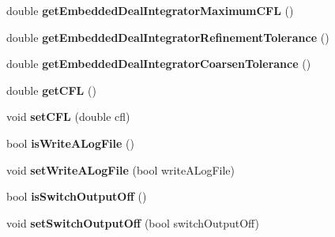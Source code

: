 \begin{DoxyCompactItemize}
\item 
\hypertarget{classnatrium_1_1SolverConfiguration_a0116178f32e79bc60e115135becba20d}{
double {\bfseries getEmbeddedDealIntegratorMaximumCFL} ()}
\label{classnatrium_1_1SolverConfiguration_a0116178f32e79bc60e115135becba20d}

\item 
\hypertarget{classnatrium_1_1SolverConfiguration_a2c6da5cc4bcfc653c0f3b93b57a4ddf5}{
double {\bfseries getEmbeddedDealIntegratorRefinementTolerance} ()}
\label{classnatrium_1_1SolverConfiguration_a2c6da5cc4bcfc653c0f3b93b57a4ddf5}

\item 
\hypertarget{classnatrium_1_1SolverConfiguration_afedfb3328b78940a7e929214c6d08741}{
double {\bfseries getEmbeddedDealIntegratorCoarsenTolerance} ()}
\label{classnatrium_1_1SolverConfiguration_afedfb3328b78940a7e929214c6d08741}

\item 
\hypertarget{classnatrium_1_1SolverConfiguration_ae5991b39b24428e10baf44778d5a984f}{
double {\bfseries getCFL} ()}
\label{classnatrium_1_1SolverConfiguration_ae5991b39b24428e10baf44778d5a984f}

\item 
\hypertarget{classnatrium_1_1SolverConfiguration_a91699424349ebb691788cb053ca08da1}{
void {\bfseries setCFL} (double cfl)}
\label{classnatrium_1_1SolverConfiguration_a91699424349ebb691788cb053ca08da1}

\item 
\hypertarget{classnatrium_1_1SolverConfiguration_ac97dc43684f8a690de0f3e9c132dda02}{
bool {\bfseries isWriteALogFile} ()}
\label{classnatrium_1_1SolverConfiguration_ac97dc43684f8a690de0f3e9c132dda02}

\item 
\hypertarget{classnatrium_1_1SolverConfiguration_a6e50f8fc372b4346ba9f309d5d5f47b3}{
void {\bfseries setWriteALogFile} (bool writeALogFile)}
\label{classnatrium_1_1SolverConfiguration_a6e50f8fc372b4346ba9f309d5d5f47b3}

\item 
\hypertarget{classnatrium_1_1SolverConfiguration_ae4852378b026ccc913732eb8b20eca74}{
bool {\bfseries isSwitchOutputOff} ()}
\label{classnatrium_1_1SolverConfiguration_ae4852378b026ccc913732eb8b20eca74}

\item 
\hypertarget{classnatrium_1_1SolverConfiguration_afcae7f43456c2a127c242b230ea3a8a2}{
void {\bfseries setSwitchOutputOff} (bool switchOutputOff)}
\label{classnatrium_1_1SolverConfiguration_afcae7f43456c2a127c242b230ea3a8a2}


\end{DoxyCompactItemize}
